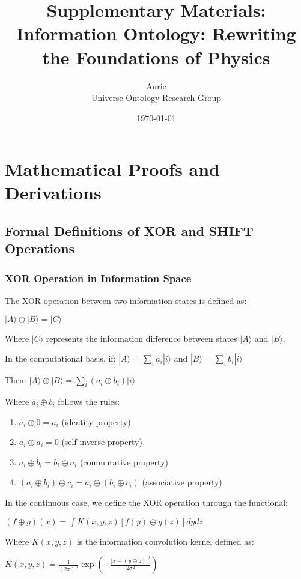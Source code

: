 \documentclass[12pt,letterpaper]{article}
\title{Supplementary Materials:\\Information Ontology: Rewriting the Foundations of Physics}
\author{Auric\\
\small{Universe Ontology Research Group}}
\date{\today}
\begin{document}
\maketitle

\tableofcontents
\newpage

\section{Mathematical Proofs and Derivations}

\subsection{Formal Definitions of XOR and SHIFT Operations}

\subsubsection{XOR Operation in Information Space}

The XOR operation between two information states is defined as:

$|A\rangle \oplus |B\rangle = |C\rangle$

Where $|C\rangle$ represents the information difference between states $|A\rangle$ and $|B\rangle$. 

In the computational basis, if:
$|A\rangle = \sum_i a_i |i\rangle$ and $|B\rangle = \sum_i b_i |i\rangle$

Then:
$|A\rangle \oplus |B\rangle = \sum_i (a_i \oplus b_i) |i\rangle$

Where $a_i \oplus b_i$ follows the rules:
\begin{enumerate}
\item $a_i \oplus 0 = a_i$ (identity property)
\item $a_i \oplus a_i = 0$ (self-inverse property)
\item $a_i \oplus b_i = b_i \oplus a_i$ (commutative property)
\item $(a_i \oplus b_i) \oplus c_i = a_i \oplus (b_i \oplus c_i)$ (associative property)
\end{enumerate}

In the continuous case, we define the XOR operation through the functional:

$(f \oplus g)(x) = \int K(x,y,z)[f(y) \oplus g(z)]dydz$

Where $K(x,y,z)$ is the information convolution kernel defined as:

$K(x,y,z) = \frac{1}{(2\pi)^n}\exp\left(-\frac{|x-(y \oplus z)|^2}{2\sigma^2}\right)$
\end{document}
